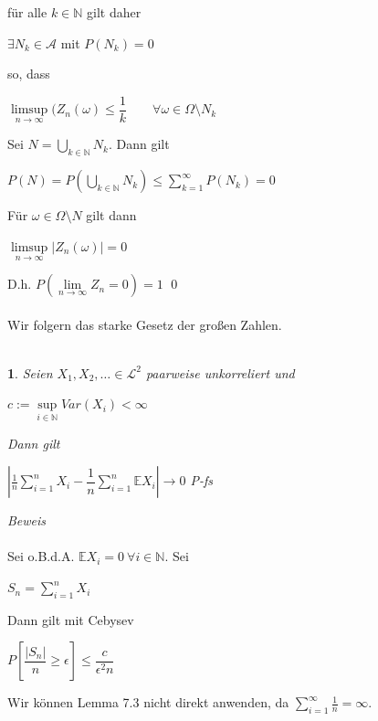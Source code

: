 \documentclass[10pt,a4paper]{report}
\newcommand{\E}{\mathbb{E}}
\numberwithin{equation}{section}
\numberwithin{figure}{section}
\theoremstyle{plain}
\theoremstyle{definition}
\theoremstyle{plain}
\newtheorem{prop}{\protect\propositionname}[section]
\theoremstyle{definition}
\theoremstyle{remark}
\theoremstyle{plain}
\theoremstyle{plain}
\theoremstyle{plain}
\theoremstyle{plain}
\theoremstyle{plain}
\providecommand{\propositionname}{Satz}
\newcommand{\1}{ \mathbb{1} } %
\begin{document}
für alle $k \in \mathbb{N}$ gilt daher
\begin{center}
$\exists N_k \in \mathcal{A}$ mit $P(N_k)=0$
\end{center}
so, dass
\begin{center}
$\limsup\limits_{n \to \infty} (Z_n(\omega)\leq \dfrac{1}{k}\qquad \forall\omega \in \Omega\setminus N_k$
\end{center}
Sei $N=\bigcup\limits_{k \in \mathbb{N}}N_k$. Dann gilt
\begin{center}
$P(N)=P\left(\bigcup\limits_{k \in \mathbb{N}}N_k\right)\leq \sum\limits_{k=1}^\infty P(N_k)=0$
\end{center}
Für $\omega \in \Omega\setminus N$ gilt dann
\begin{center}
$\limsup\limits_{n \to \infty} |Z_n(\omega)|=0$
\end{center}
D.h. $P\left(\lim\limits_{n \to \infty}Z_n=0\right)=1$ \qed\\\\
Wir folgern das starke Gesetz der großen Zahlen.\\\\
\begin{prop}
  Seien $X_1,X_2,\ldots \in \mathcal{L}^2$ paarweise unkorreliert und
  \begin{center}
    $c:=\sup\limits_{i \in \mathbb{N}} Var(X_i) < \infty$
  \end{center}
  Dann gilt
  \begin{center}
    $\left|\frac{1}{n}\sum\limits_{i=1}^nX_i-\dfrac{1}{n}\sum\limits_{i=1}^n\mathbb{E}X_i\right|
    \to 0$ P-fs
  \end{center}
\end{prop}
\textit{Beweis}\\\\
Sei o.B.d.A. $\E X_i=0 ~ \forall i \in \mathbb{N}$. Sei
\begin{center}
$S_n=\sum\limits_{i=1}^nX_i$
\end{center}
Dann gilt mit Cebysev
\begin{center}
$P\left[\dfrac{|S_n|}{n}\geq \epsilon\right]\leq \dfrac{c}{\epsilon^2n}$
\end{center}
Wir können Lemma 7.3 nicht direkt anwenden, da $\sum\limits_{i=1}^\infty \frac{1}{n}=\infty$.
\end{document}
